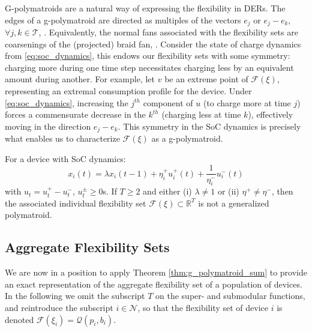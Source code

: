 \begin{remark}\label{rem:genpolyedges}
    G-polymatroids are a natural way of expressing the flexibility in DERs. The edges of a g-polymatroid are directed as multiples of the vectors $e_j$ or $e_j - e_k$, $\forall j,k \in \mathcal{T}$, \cite{Frank2014CharacterizingPolymatroids}. Equivalently, the normal fans associated with the flexibility sets are coarsenings of the (projected) braid fan, \cite[3.2]{PostnikovAlex2008FacesPermutohedra.}. Consider the state of charge dynamics from \eqref{eq:soc_dynamics}, this endows our flexibility sets with some symmetry: charging more during one time step necessitates charging less by an equivalent amount during another. For example, let $v$ be an extreme point of $\mathcal{F}(\xi)$, representing an extremal consumption profile for the device. Under \eqref{eq:soc_dynamics}, increasing the $j^{th}$ component of $u$ (to charge more at time $j$) forces a commensurate decrease in the $k^{th}$ (charging less at time $k$), effectively moving in the direction $e_j - e_k$.
    This symmetry in the SoC dynamics is precisely what enables us to characterize $\mathcal{F}(\xi)$ as a g-polymatroid.
    \end{remark}


\begin{lemma}\label{lem:no_go}
    For a device with SoC dynamics:
    \[
        x_i(t) =  \lambda x_i(t-1) + \eta_i^+ u_i^+(t) + \frac{1}{\eta_i^-} u_i^-(t)
    \]
    with $u_t=u_t^+-u_t^-$, $u_t^\pm\ge0$s. If $T\ge2$ and either (i) $\lambda\ne1$ or (ii) $\eta^+\ne\eta^-$, then the associated individual flexibility set $\mathcal{F}(\xi)\subset\mathbb{R}^T$ is not a generalized polymatroid.
    \end{lemma}
    
   


\subsection{Aggregate Flexibility Sets}
    We are now in a position to apply Theorem \ref{thm:g_polymatroid_sum} to provide an exact representation of the aggregate flexibility set of a population of devices. In the following we omit the subscript $T$ on the super- and submodular functions, and reintroduce the subscript $i \in \mathcal{N}$, so that the flexibility set of device $i$ is denoted $\mathcal{F}(\xi_i) = \mathcal{Q}(p_i, b_i)$.

